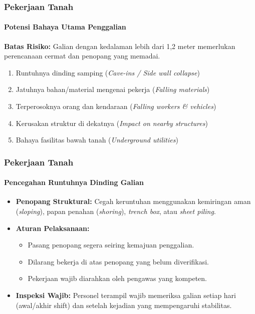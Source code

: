 \documentclass[../main.tex]{subfiles}
\begin{document}
\begin{frame}[mytitle=standard,t,mycolor=white,light]
	\frametitle{Pekerjaan Tanah}
	\framesubtitle{Potensi Bahaya Utama Penggalian}
	\textbf{Batas Risiko:} Galian dengan kedalaman lebih dari 1,2 meter memerlukan perencanaan cermat dan penopang yang memadai.
	\vspace{0.5em}
	\begin{enumerate}
		\item Runtuhnya dinding samping (\textit{Cave-ins / Side wall collapse})
		\item Jatuhnya bahan/material mengenai pekerja (\textit{Falling materials})
		\item Terperosoknya orang dan kendaraan (\textit{Falling workers \& vehicles})
		\item Kerusakan struktur di dekatnya (\textit{Impact on nearby structures})
		\item Bahaya fasilitas bawah tanah (\textit{Underground utilities})
	\end{enumerate}
\end{frame}

\begin{frame}[mytitle=standard,t,mycolor=digiPH_gray,light]
	\frametitle{Pekerjaan Tanah}
	\framesubtitle{Pencegahan Runtuhnya Dinding Galian}
	\begin{itemize}
		\item \textbf{Penopang Struktural:} Cegah keruntuhan menggunakan kemiringan aman (\textit{sloping}), papan penahan (\textit{shoring}), \textit{trench box}, atau \textit{sheet piling}.
		\item \textbf{Aturan Pelaksanaan:}
		      \begin{itemize}
			      \item Pasang penopang segera seiring kemajuan penggalian.
			      \item Dilarang bekerja di atas penopang yang belum diverifikasi.
			      \item Pekerjaan wajib diarahkan oleh pengawas yang kompeten.
		      \end{itemize}
		\item \textbf{Inspeksi Wajib:} Personel terampil wajib memeriksa galian setiap hari (awal/akhir shift) dan setelah kejadian yang mempengaruhi stabilitas.
	\end{itemize}
\end{frame}
\end{document}
